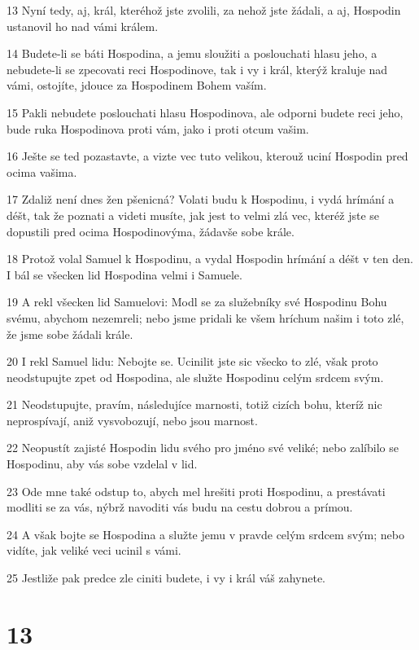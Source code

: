 \par 13 Nyní tedy, aj, král, kteréhož jste zvolili, za nehož jste žádali, a aj, Hospodin ustanovil ho nad vámi králem.
\par 14 Budete-li se báti Hospodina, a jemu sloužiti a poslouchati hlasu jeho, a nebudete-li se zpecovati reci Hospodinove, tak i vy i král, kterýž kraluje nad vámi, ostojíte, jdouce za Hospodinem Bohem vaším.
\par 15 Pakli nebudete poslouchati hlasu Hospodinova, ale odporni budete reci jeho, bude ruka Hospodinova proti vám, jako i proti otcum vašim.
\par 16 Ješte se ted pozastavte, a vizte vec tuto velikou, kterouž uciní Hospodin pred ocima vašima.
\par 17 Zdaliž není dnes žen pšenicná? Volati budu k Hospodinu, i vydá hrímání a déšt, tak že poznati a videti musíte, jak jest to velmi zlá vec, kteréž jste se dopustili pred ocima Hospodinovýma, žádavše sobe krále.
\par 18 Protož volal Samuel k Hospodinu, a vydal Hospodin hrímání a déšt v ten den. I bál se všecken lid Hospodina velmi i Samuele.
\par 19 A rekl všecken lid Samuelovi: Modl se za služebníky své Hospodinu Bohu svému, abychom nezemreli; nebo jsme pridali ke všem hríchum našim i toto zlé, že jsme sobe žádali krále.
\par 20 I rekl Samuel lidu: Nebojte se. Ucinilit jste sic všecko to zlé, však proto neodstupujte zpet od Hospodina, ale služte Hospodinu celým srdcem svým.
\par 21 Neodstupujte, pravím, následujíce marnosti, totiž cizích bohu, kteríž nic neprospívají, aniž vysvobozují, nebo jsou marnost.
\par 22 Neopustít zajisté Hospodin lidu svého pro jméno své veliké; nebo zalíbilo se Hospodinu, aby vás sobe vzdelal v lid.
\par 23 Ode mne také odstup to, abych mel hrešiti proti Hospodinu, a prestávati modliti se za vás, nýbrž navoditi vás budu na cestu dobrou a prímou.
\par 24 A však bojte se Hospodina a služte jemu v pravde celým srdcem svým; nebo vidíte, jak veliké veci ucinil s vámi.
\par 25 Jestliže pak predce zle ciniti budete, i vy i král váš zahynete.

\chapter{13}

